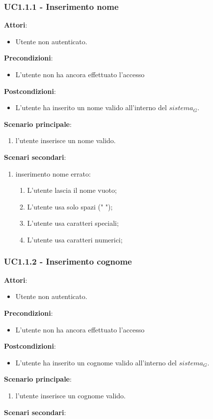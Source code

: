 \subsubsection{UC1.1.1 - Inserimento nome}\label{usecase:1_1_1}
\textbf{Attori}:
\begin{itemize}
    \item Utente non autenticato.
\end{itemize}
\textbf{Precondizioni}:
\begin{itemize}
    \item L'utente non ha ancora effettuato l'accesso
\end{itemize}
\textbf{Postcondizioni}:
\begin{itemize}
    \item L'utente ha inserito un nome valido all'interno del $\textit{sistema}_G$.
\end{itemize}
\textbf{Scenario principale}:
\begin{enumerate}
    \item l'utente inserisce un nome valido.
\end{enumerate}
\textbf{Scenari secondari}:

\begin{enumerate}
    \item inserimento nome errato:
    \begin{enumerate}
        \item L'utente lascia il nome vuoto;
        \item L'utente usa solo spazi (" ");
        \item L'utente usa caratteri speciali;
        \item L'utente usa caratteri numerici;
    \end{enumerate}

\end{enumerate}


\subsubsection{UC1.1.2 - Inserimento cognome}\label{usecase:1_1_2}
\textbf{Attori}:
\begin{itemize}
    \item Utente non autenticato.
\end{itemize}
\textbf{Precondizioni}:
\begin{itemize}
    \item L'utente non ha ancora effettuato l'accesso
\end{itemize}
\textbf{Postcondizioni}:
\begin{itemize}
    \item L'utente ha inserito un cognome valido all'interno del $\textit{sistema}_G$.
\end{itemize}
\textbf{Scenario principale}:
\begin{enumerate}
    \item l'utente inserisce un cognome valido.
\end{enumerate}
\textbf{Scenari secondari}:

